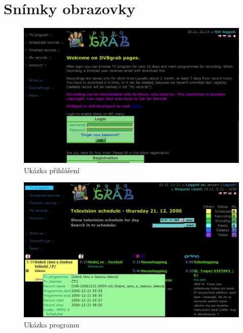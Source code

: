 \documentclass[11pt,twoside,a4paper]{dp_format}%
\begin{document}
\chapter{Snímky obrazovky}
\begin{figure}[ht]
\begin{center}
\includegraphics[width=12cm]{images/scrPrihlaseni}
\caption{Ukázka přihlášení}
\label{fig:scr1}
\end{center}
\end{figure}

\nopagebreak 

\begin{figure}[ht]
\begin{center}
\includegraphics[width=12cm]{images/scrProgram}
\caption{Ukázka programu}
\label{fig:scr2}
\end{center}
\end{figure}

\vfil
\pagebreak
\end{document}
